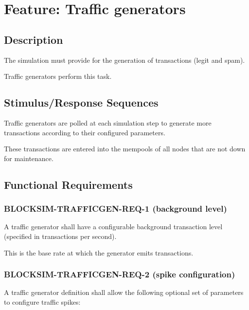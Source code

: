 \documentclass{scrreprt}
\begin{document}
  \section{Feature: Traffic generators}

    \subsection{Description}

      The simulation must provide for the generation of transactions (legit and
      spam).

      Traffic generators perform this task.

    \subsection{Stimulus/Response Sequences}

      Traffic generators are polled at each simulation step to generate more
      transactions according to their configured parameters.

      These transactions are entered into the mempools of all nodes that are
      not down for maintenance.

    \subsection{Functional Requirements}

      \subsubsection{BLOCKSIM-TRAFFICGEN-REQ-1 (background level)}

        A traffic generator shall have a configurable background transaction
        level (specified in transactions per second).

        This is the base rate at which the generator emits transactions.

      \subsubsection{BLOCKSIM-TRAFFICGEN-REQ-2 (spike configuration)}

        A traffic generator definition shall allow the following optional set
        of parameters to configure traffic spikes:
\end{document}
